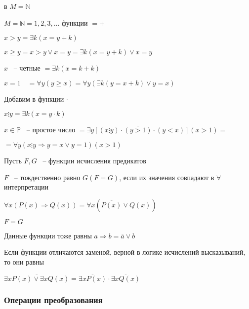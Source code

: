 \documentclass[russian]{lecture-notes}
\begin{document}
    в $M = \mathbb{N}$


    \begin{example}
        $M = \mathbb{N} = { 1, 2, 3, \dots}$ функции  $= +$

        $x > y = \exists k (x = y + k)$

        $x \geq y = x > y \lor x = y = \exists k (x = y + k)  \lor x = y$

        $x$ ~-- четные $= \exists k (x = k + k)$

        $x = 1 \quad = \forall y (y \geq x) = \forall y (\exists k (y = x + k) \lor y = x)$

        Добавим в функции $\cdot$

        $x \vdots y =  \exists k (x = y \cdot k)$

        $x \in \mathbb{P}$ ~-- простое число $= \overline{\exists y [(x \vdots y) \cdot (y > 1) \cdot (y < x)]} (x > 1) = $

        $= \forall y (x \vdots y \Rightarrow y = x \lor y = 1) (x > 1)$

    \end{example}

    \begin{definition}
        Пусть $F, G$ ~-- функции исчисления предикатов

        $F$ ~-- тождественно равно $G (F = G)$, если их значения совпадают в $\forall$ интерпретации
    \end{definition}

    \begin{example}
        $\forall x (P(x) \Rightarrow Q(x)) = \forall x (\overline{P(x)} \lor Q(x))$

        $F = G$

        Данные функции тоже равны $a \Rightarrow b = \overline{a} \lor b$
    \end{example}

    \begin{remark}
        Если функции отличаются заменой, верной в логике исчислений высказываний, то они равны
    \end{remark}

    \begin{example}
        $\overline{\exists x P(x) \lor \exists x Q(x)} = \overline{\exists x P(x)} \cdot \overline{\exists x Q(x)}$
    \end{example}

    \subsubsection{Операции преобразования}
\end{document}
